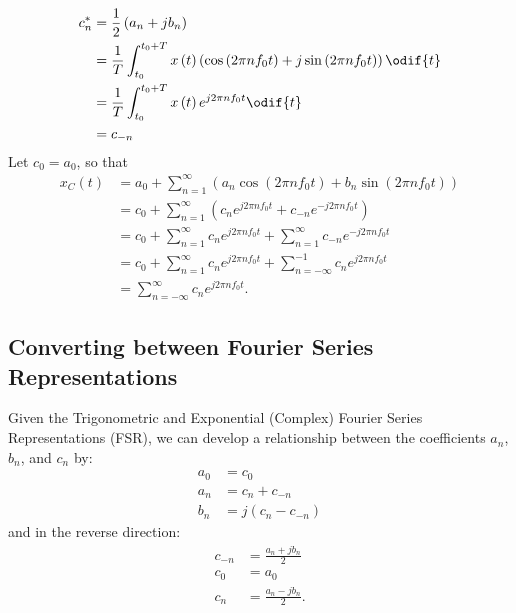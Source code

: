 \documentclass{article}
\begin{document}
\begin{align*}
    c_n^\ast & = \frac{1}{2} \left( a_n + j b_n \right)                                                                                                             \\
             & = \frac{1}{T} \int_{t_0}^{t_0 + T} x\left( t \right) \left( \cos{\left( 2\pi n f_0 t \right)} + j \sin{\left( 2\pi n f_0 t \right)} \right) \odif{t} \\
             & = \frac{1}{T} \int_{t_0}^{t_0 + T} x\left( t \right) e^{j 2\pi n f_0 t} \odif{t}                                                                     \\
             & = c_{-n}
\end{align*}
Let \(c_0 = a_0\), so that
\begin{align*}
    x_C\left( t \right) & = a_0 + \sum_{n = 1}^\infty \left( a_n \cos{\left( 2\pi n f_0 t \right)} + b_n \sin{\left( 2\pi n f_0 t \right)} \right) \\
                        & = c_0 + \sum_{n = 1}^\infty \left( c_n e^{j 2\pi n f_0 t} + c_{-n} e^{-j 2\pi n f_0 t} \right)                           \\
                        & = c_0 + \sum_{n = 1}^\infty c_n e^{j 2\pi n f_0 t} + \sum_{n = 1}^\infty c_{-n} e^{-j 2\pi n f_0 t}                      \\
                        & = c_0 + \sum_{n = 1}^\infty c_n e^{j 2\pi n f_0 t} + \sum_{n = -\infty}^{-1} c_{n} e^{j 2\pi n f_0 t}                    \\
                        & = \sum_{n = -\infty}^\infty c_n e^{j 2\pi n f_0 t}.
\end{align*}
\subsection{Converting between Fourier Series Representations}
Given the Trigonometric and Exponential (Complex) Fourier Series Representations (FSR),
we can develop a relationship between the coefficients \(a_n\), \(b_n\), and \(c_n\) by:
\begin{align*}
    a_0 & = c_0                           \\
    a_n & = c_n + c_{-n}                  \\
    b_n & = j \left( c_n - c_{-n} \right)
\end{align*}
and in the reverse direction:
\begin{align*}
    c_{-n} & = \frac{a_n + j b_n}{2}  \\
    c_0    & = a_0                    \\
    c_n    & = \frac{a_n - j b_n}{2}.
\end{align*}
\end{document}
